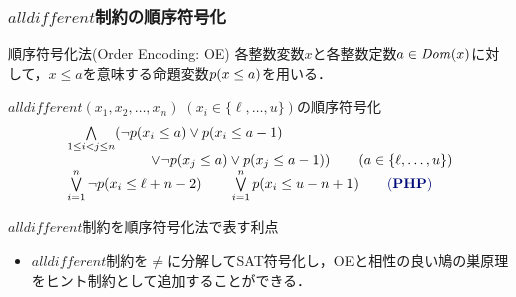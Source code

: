 \documentclass [dvipdfmx,11pt]{beamer}
\newcommand{\alldifferent}{$alldifferent$}
\begin{document}
\begin{frame}
    \frametitle{{\alldifferent}制約の順序符号化}
    \begin{block}{順序符号化法(Order Encoding: OE)}
        各整数変数$x$と各整数定数$a \in {\it Dom}(x)$に対して，$x \le a$を意味する命題変数\alert{\bf $p(x\le a)$}を用いる．
    \end{block}
    \begin{exampleblock}{{$alldifferent(x_{1},x_{2},\ldots, x_{n}) \; (x_i \in \{\ell,\dots,u\})$}の順序符号化}
        \begin{displaymath}
            \begin{array}{l}
            \bigwedge\limits_{1 \leq i < j \leq n} (\lnot \oE{x_i}{a} \lor \oE{x_i}{a-1} \\
            \qquad \qquad \qquad \lor \lnot \oE{x_j}{a} \lor \oE{x_j}{a-1})  \qquad (a \in \{\ell,\ldots, u\}) \\
            \bigvee\limits_{i=1}^{n} \lnot \oE{x_i}{\ell+n-2} \qquad \bigvee\limits_{i=1}^{n} \oE{x_i}{u-n+1} \qquad {\color[HTML]{000C79} \bf (PHP)}
            \end{array}
        \end{displaymath}
    \end{exampleblock}
    \begin{alertblock}{{\alldifferent}制約を順序符号化法で表す利点}
        \begin{itemize}
            \item {\alldifferent}制約を$\neq$に分解してSAT符号化し，OEと相性の良い鳩の巣原理をヒント制約として追加することができる．
        \end{itemize}
    \end{alertblock}
\end{frame}
\end{document}
